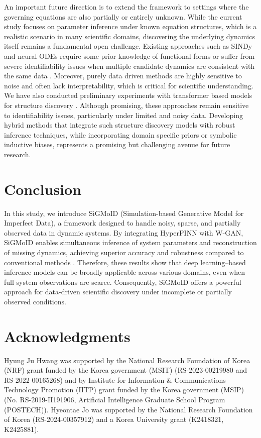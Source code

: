 \documentclass[letterpaper]{article} %
\theoremstyle{thmstyleone}%
\theoremstyle{thmstyletwo}%
\theoremstyle{thmstylethree}%
\begin{document}
An important future direction is to extend the framework to settings where the governing equations are also partially or entirely unknown. While the current study focuses on parameter inference under known equation structures, which is a realistic scenario in many scientific domains, discovering the underlying dynamics itself remains a fundamental open challenge. Existing approaches such as SINDy and neural ODEs require some prior knowledge of functional forms or suffer from severe identifiability issues when multiple candidate dynamics are consistent with the same data \cite{champion2019data, chen2018neural}. Moreover, purely data driven methods are highly sensitive to noise and often lack interpretability, which is critical for scientific understanding. We have also conducted preliminary experiments with transformer based models for structure discovery \cite{d2023odeformer}. Although promising, these approaches remain sensitive to identifiability issues, particularly under limited and noisy data. Developing hybrid methods that integrate such structure discovery models with robust inference techniques, while incorporating domain specific priors or symbolic inductive biases, represents a promising but challenging avenue for future research.

\section*{Conclusion}
In this study, we introduce SiGMoID (Simulation-based Generative Model for Imperfect Data), a framework designed to handle noisy, sparse, and partially observed data in dynamic systems. By integrating HyperPINN with W-GAN, SiGMoID enables simultaneous inference of system parameters and reconstruction of missing dynamics, achieving superior accuracy and robustness compared to conventional methods \cite{dondelinger2013ode, wenk2019fast, yang2021inference, stepaniants2024discovering}. Therefore, these results show that deep learning–based inference models can be broadly applicable across various domains, even when full system observations are scarce. Consequently, SiGMoID offers a powerful approach for data-driven scientific discovery under incomplete or partially observed conditions.

\section{Acknowledgments}
Hyung Ju Hwang was supported by the National Research Foundation of Korea (NRF) grant funded by the Korea government (MSIT) (RS-2023-00219980 and RS-2022-00165268) and by Institute for Information \& Communications Technology Promotion (IITP) grant funded by the Korea government (MSIP) (No. RS-2019-II191906, Artificial Intelligence Graduate School Program (POSTECH)). Hyeontae Jo was supported by the National Research Foundation of Korea (RS-2024-00357912) and a Korea University grant (K2418321, K2425881).
\end{document}
